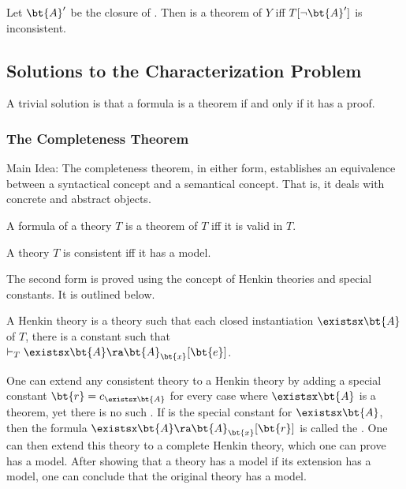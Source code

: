 \begin{corollary}
	Let $\bt{A}'$ be the closure of . Then  is a 
	theorem of $Y$ iff $T[\neg \bt{A}']$ is inconsistent.
\end{corollary}


\subsection{Solutions to the Characterization Problem}

A trivial solution is that a formula is a theorem if and only if it 
has a proof.

\subsubsection{The Completeness Theorem}

Main Idea: The completeness theorem, in either form, establishes an 
equivalence between a syntactical concept and a semantical concept. 
That is, it deals with concrete and abstract objects.

\begin{theorem}
	A formula  of a theory $T$ is a theorem of $T$ iff it is 
	valid in $T$.
\end{theorem}

\begin{theorem}
	A theory $T$ is consistent iff it has a model.
\end{theorem}

The second form is proved using the concept of Henkin theories and 
special constants. It is outlined below.

\begin{definition}
	A Henkin theory is a theory such 
	that each closed instantiation $\existsx \bt{A}$ of $T$, there 
	is a constant  such that \\ $\vdash_T \existsx \bt{A} \ra 
	\bt{A}_\bt{x}[\bt{e}]$.
\end{definition}

One can extend any consistent theory to a Henkin theory by adding a 
special constant $\bt{r} = c_{\existsx
\bt{A}}$ for every case where $\existsx \bt{A}$ is a theorem, yet 
there is no such . If  is the special constant for 
$\existsx \bt{A}$, then the formula $\existsx \bt{A} \ra 
\bt{A}_\bt{x}[\bt{r}]$ is called the  
. One can then extend this theory 
to a complete Henkin theory, which one can prove has a model. After 
showing that a theory has a model if its extension has a model, one 
can conclude that the original theory has a model.

